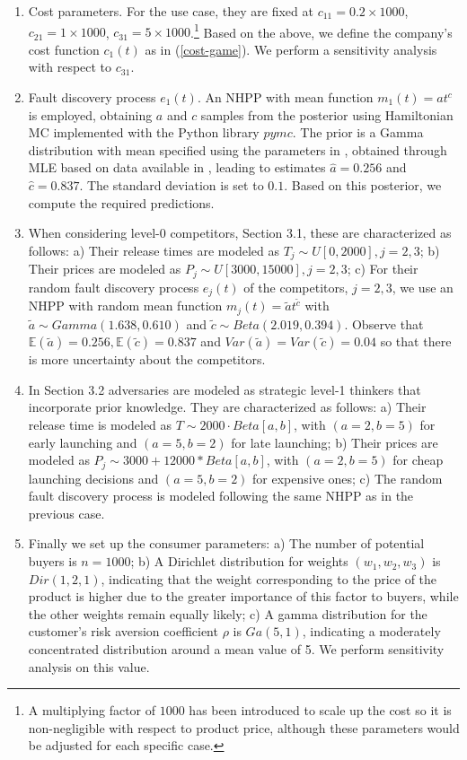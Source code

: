 \documentclass[a4paper,fleqn, 11pt]{cas-sc}
\begin{document}
    \begin{enumerate}
        \item Cost parameters. For the use case, they are fixed at 
         $c_{11}=0.2 \times 1000$, $c_{21}=1 \times 1000 $, $c_{31}=5 \times 1000 $.\footnote{ A multiplying factor of $1000$ has been introduced to scale up the cost so it is non-negligible with respect to product price, although these parameters would be adjusted for each specific case.} Based on the above, we define the company's cost function $c_1 (t)$ as in (\ref{cost-game}). We perform a sensitivity analysis with respect to $c_{31}$.
        \item Fault discovery process $e_1 (t)$. An NHPP with mean function $m_1 (t)= a t^c$ is employed, obtaining $a$ and $c$ samples from the posterior using Hamiltonian MC implemented with the Python library $pymc$. The prior is a Gamma distribution with mean specified using the parameters in \cite{Zeephongsekul1995}, obtained through MLE based on data available 
         in \cite{Okumoto1979}, leading to estimates $\hat{a}=0.256$ and $\hat{c}=0.837$. The standard deviation is set to $0.1$. Based on this posterior, we compute the required predictions.
    \item When considering level-0 competitors, Section 3.1, these are characterized as follows:
    a) Their release times are modeled as  $T_j \sim U [0,2000], j=2,3$; b) Their prices are modeled as $P_j \sim U[3000,15000], j=2,3$; c) For their random fault discovery process $e_j(t)$ of the competitors, $j=2,3$, we use an NHPP with random mean function
       $m_j (t)= \tilde{a} t^{\tilde{c}}$ with $\tilde{a}\sim Gamma(1.638,0.610)$ and   
       $\tilde{c} \sim Beta \left( 2.019, 0.394 \right)$. Observe that $\mathbb{E}(\tilde{a})=0.256, \mathbb{E}(\tilde{c})=0.837$ and $Var(\tilde{a})=Var(\tilde{c})=0.04$ so that there is more uncertainty about the competitors.
    
    \item In Section 3.2 adversaries are modeled as strategic level-1 thinkers that incorporate prior knowledge.
     They  are characterized as follows:
    a) Their release time is modeled as  $T \sim 2000 \cdot Beta [a,b]$, with $(a=2, b=5)$ for early launching and $(a=5, b=2)$ for late launching; b) Their prices are modeled as $P_j \sim 3000 + 12000 * Beta [a,b]$, with $(a=2, b=5)$ for cheap launching decisions and $(a=5, b=2)$ for expensive ones; c) The random fault discovery process is modeled following the same NHPP as in the previous case. 
    \item Finally we set up the consumer parameters:
    a) The number of potential buyers is $n=1000$; 
     b) A Dirichlet distribution for weights $(w_1,w_2,w_3)$ is $Dir (1,2,1)$, indicating that the weight corresponding to the price of the product is higher due to the greater importance of this factor to buyers, while the other weights remain equally likely; c) A gamma distribution for the customer's risk aversion coefficient $\rho$  is $Ga (5, 1)$, indicating a moderately concentrated distribution around a mean value of 5. We perform sensitivity analysis on this value. 
        \end{enumerate}
\end{document}
